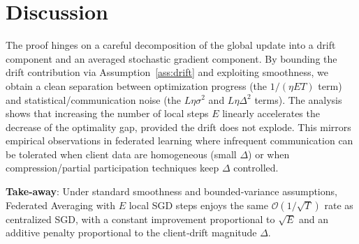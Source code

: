 \documentclass{article}
\begin{document}
\section*{Discussion}
The proof hinges on a careful decomposition of the global update into a drift component and an averaged stochastic gradient component.  By bounding the drift contribution via Assumption~\ref{ass:drift} and exploiting smoothness, we obtain a clean separation between optimization progress (the $1/(\eta E T)$ term) and statistical/communication noise (the $L\eta\sigma^{2}$ and $L\eta\Delta^{2}$ terms).  The analysis shows that increasing the number of local steps $E$ linearly accelerates the decrease of the optimality gap, provided the drift does not explode.  This mirrors empirical observations in federated learning where infrequent communication can be tolerated when client data are homogeneous (small $\Delta$) or when compression/partial participation techniques keep $\Delta$ controlled.

\bigskip
\noindent\textbf{Take‑away}: Under standard smoothness and bounded‑variance assumptions, Federated Averaging with $E$ local SGD steps enjoys the same $\mathcal{O}(1/\sqrt{T})$ rate as centralized SGD, with a constant improvement proportional to $\sqrt{E}$ and an additive penalty proportional to the client‑drift magnitude $\Delta$.
\end{document}
